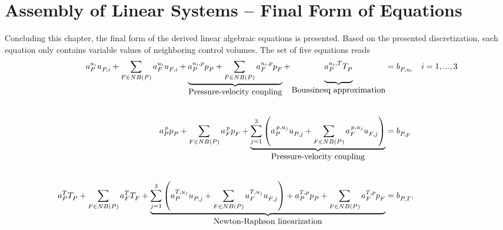 \section{Assembly of Linear Systems -- Final Form of Equations}
\label{sec:cpldassembly}

Concluding this chapter, the final form of the derived linear algebraic equations is presented. Based on the presented discretization, each equation only contains variable values of neighboring control volumes. The set of five equations reads
\begin{align*}
  a_P^{u_i} u_{P,i}^{\vphantom{u_i}}
  + \sum_{F \in NB(P)} a_F^{u_i} u_{F,i}^{\vphantom{u_i}} 
  + \underbrace{\vphantom{\sum_F}{a_P^{u_i,p} p_P^{\vphantom{u_i,p}}
  + \sum_{F \in NB(P)} a_F^{u_i,p} p_F^{\vphantom{u_i,p}}}}_{\hbox{Pressure-velocity coupling}} 
  + \underbrace{\vphantom{\sum_F}{ a_P^{u_i,T} T_P^{\vphantom{u_i,T}}}}_{\hbox{Boussinesq approximation}} 
  &= b_{P,u_i}^{\vphantom{u_i,T}} \quad i=1,...,3  \\[2.0em]
  a_P^{\, p} p_{P}^{\vphantom{p}} 
  + \sum_{F \in NB(P)} a_F^{\,p} p_F^{\vphantom{\,p}} 
  + \underbrace{ \sum_{j=1}^3 \left(a_P^{\,p,u_j} u_{P,j}^{\vphantom{p,u_j}}
  + \sum_{F \in NB(P)} a_F^{\, p,u_j} u_{F,j}^{\vphantom{p,u_j}} \right)}_{\hbox{Pressure-velocity coupling}} 
  &= b_{P,p}^{\vphantom{p,u_j}}  \\[2.0em]
  a_P^{T} T_{P}^{\vphantom{T}} 
  + \sum_{F \in NB(P)} a_F^{T} T_F^{\vphantom{T}} 
  + \underbrace{\sum_{j=1}^3 \left(a_P^{T,u_j} u_{P,j}^{\vphantom{T,u_j}}
  + \sum_{F \in NB(P)} a_F^{T,u_j} u_{F,j}^{\vphantom{T,u_j}} \right) 
  + a_P^{T,p} p_P^{\vphantom{T,p}} 
+ \sum_{F \in NB(P) } a_F^{T,p} p_F^{\vphantom{T,p}}}_{\hbox{Newton-Raphson linearization}} 
  &= b_{P,T}^{\vphantom{T,p}}.
\end{align*}

